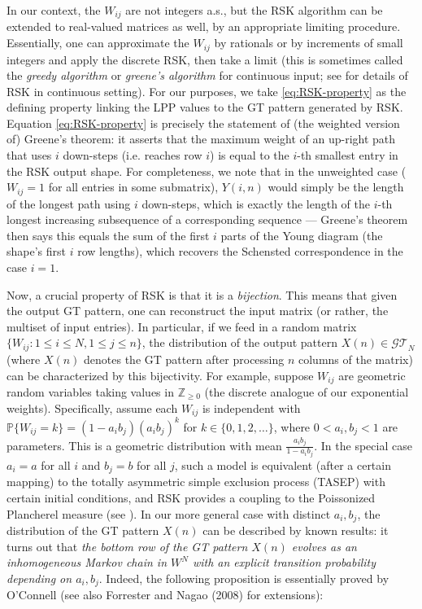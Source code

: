 \documentclass[letterpaper,11pt,oneside,reqno]{article}
\numberwithin{equation}{section}
\theoremstyle{definition}
\begin{document}
In our context, the $W_{ij}$ are not integers a.s., but the RSK algorithm can be extended to real-valued matrices as well, by an appropriate limiting procedure. Essentially, one can approximate the $W_{ij}$ by rationals or by increments of small integers and apply the discrete RSK, then take a limit (this is sometimes called the \emph{greedy algorithm} or \emph{greene's algorithm} for continuous input; see \cite{Doumerc2003} for details of RSK in continuous setting). For our purposes, we take \eqref{eq:RSK-property} as the defining property linking the LPP values to the GT pattern generated by RSK. Equation \eqref{eq:RSK-property} is precisely the statement of (the weighted version of) Greene's theorem: it asserts that the maximum weight of an up-right path that uses $i$ down-steps (i.e. reaches row $i$) is equal to the $i$-th smallest entry in the RSK output shape. For completeness, we note that in the unweighted case ($W_{ij}=1$ for all entries in some submatrix), $Y(i,n)$ would simply be the length of the longest path using $i$ down-steps, which is exactly the length of the $i$-th longest increasing subsequence of a corresponding sequence --- Greene's theorem then says this equals the sum of the first $i$ parts of the Young diagram (the shape's first $i$ row lengths), which recovers the Schensted correspondence in the case $i=1$.

Now, a crucial property of RSK is that it is a \emph{bijection}. This means that given the output GT pattern, one can reconstruct the input matrix (or rather, the multiset of input entries). In particular, if we feed in a random matrix $\{W_{ij}:1\le i\le N, 1\le j\le n\}$, the distribution of the output pattern $X(n)\in \mathcal{GT}_N$ (where $X(n)$ denotes the GT pattern after processing $n$ columns of the matrix) can be characterized by this bijectivity. For example, suppose $W_{ij}$ are geometric random variables taking values in $\mathbb{Z}_{\ge0}$ (the discrete analogue of our exponential weights). Specifically, assume each $W_{ij}$ is independent with $\mathbb{P}\{W_{ij}=k\} = (1-a_i b_j) (a_i b_j)^k$ for $k\in\{0,1,2,\dots\}$, where $0<a_i, b_j <1$ are parameters. This is a geometric distribution with mean $\frac{a_i b_j}{1-a_i b_j}$. In the special case $a_i = a$ for all $i$ and $b_j=b$ for all $j$, such a model is equivalent (after a certain mapping) to the totally asymmetric simple exclusion process (TASEP) with certain initial conditions, and RSK provides a coupling to the Poissonized Plancherel measure (see \cite{OConnell2003}). In our more general case with distinct $a_i, b_j$, the distribution of the GT pattern $X(n)$ can be described by known results: it turns out that \emph{the bottom row of the GT pattern $X(n)$ evolves as an inhomogeneous Markov chain in $W^N$ with an explicit transition probability depending on $a_i, b_j$}. Indeed, the following proposition is essentially proved by O'Connell \cite{OConnell2003} (see also Forrester and Nagao (2008) \cite{ForresterNagao2008} for extensions):
\end{document}
